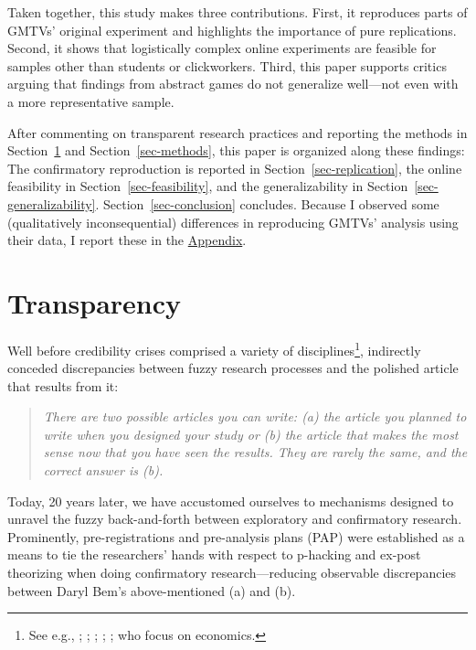 \documentclass[
  authoryear,
  review,
  3p,
  onecolumn]{elsarticle}
\begin{document}
Taken together, this study makes three contributions. First, it
reproduces parts of GMTVs' original experiment and highlights the
importance of pure replications. Second, it shows that logistically
complex online experiments are feasible for samples other than students
or clickworkers. Third, this paper supports critics arguing that
findings from abstract games do not generalize well---not even with a
more representative sample.

After commenting on transparent research practices and reporting the
methods in Section~\ref{sec-transparency} and Section~\ref{sec-methods},
this paper is organized along these findings: The confirmatory
reproduction is reported in Section~\ref{sec-replication}, the online
feasibility in Section~\ref{sec-feasibility}, and the generalizability
in Section~\ref{sec-generalizability}. Section~\ref{sec-conclusion}
concludes. Because I observed some (qualitatively inconsequential)
differences in reproducing GMTVs' analysis using their data, I report
these in the \href{@sec-appendix}{Appendix}.

\hypertarget{sec-transparency}{%
\section{Transparency}\label{sec-transparency}}

Well before credibility crises comprised a variety of
disciplines\footnote{See e.g., \citet{CamererEtAl2016};
  \citet{BrodeurEtAl2016}; \citet{BrodeurEtAl2020};
  \citet{ChristensenMiguel2018}; \citet{FerraroShukla2020};
  \citet{PageEtAl2021} who focus on economics.},
\citet[p.~2]{bemwriting} indirectly conceded discrepancies between fuzzy
research processes and the polished article that results from it:

\begin{quote}
\emph{There are two possible articles you can write: (a) the article you
planned to write when you designed your study or (b) the article that
makes the most sense now that you have seen the results. They are rarely
the same, and the correct answer is (b).}
\end{quote}

Today, 20 years later, we have accustomed ourselves to mechanisms
designed to unravel the fuzzy back-and-forth between exploratory and
confirmatory research. Prominently, pre-registrations and pre-analysis
plans (PAP) \citep[see, e.g.,][]{BrodeurEtAl2022} were established as a
means to tie the researchers' hands with respect to p-hacking and
ex-post theorizing when doing confirmatory research---reducing
observable discrepancies between Daryl Bem's above-mentioned (a) and
(b).
\end{document}
